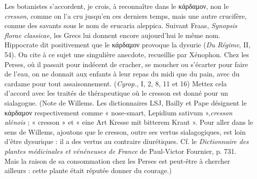 \documentclass[12pt]{book}%
\newcommand{\italique}[1]{\textit{#1}}%
\newcommand{\citComm}[1]{\begin{quoting}[vskip=0pt] #1 \end{quoting}}%
\newcommand{\latin}[1]{{\policeLat #1}}%
\newcommand{\allemand}[1]{{\policeAll #1}}%
\newcommand{\grec}[1]{#1}%
\newcommand{\anglais}[1]{{\policeAn #1}}%
\newcommand{\eff}[1]{%
{\color{orange}#1}%
}%
\newenvironment{groupe}{%
\pstart%
\ledgroup%
}{%
\pend %
}%
\newcommand{\LSJ}[0]{LSJ}%
\begin{document}
\begin{pages}
\begin{Leftside}
\begin{groupe}
{{%
%
Les botanistes s'accordent, je crois, à reconnaître dans le κάρδαμον, non le \italique{cresson}, comme on l'a cru jusqu'en ces derniers temps, mais une autre crucifère, connue des savants sous le nom de \latin{erucaria aleppica}. Suivant Fraas, \italique{Synopsis florae classicae}, les Grecs lui donnent encore aujourd'hui le même nom. Hippocrate dit positivement que le \grec{κάρδαμον} provoque la dysurie (\italique{Du Régime}, II, 54). On cite à ce sujet une singulière anecdote, recueillie par Xénophon. Chez les Perses, où il passait pour indécent de cracher, se moucher ou s'écarter pour faire de l'eau, on ne donnait aux enfants à leur repas du midi que du pain, avec du cardame pour tout assaisonnement. (\italique{Cyrop.}, I, 2, 8, 11 et 16) Mettez cela d'accord avec les traités de thérapeutique où le cresson est donné pour un sialagogue. (Note de Willems. Les dictionnaires  \LSJ , Bailly et Pape désignent le \grec{κάρδαμον} respectivement comme « \anglais{nose-smart}, \latin{Lepidium sativum} »,\italique{cresson alénois} ; « cresson » et « \allemand{eine Art Kresse mit bitterem Kraut} ».%
Pour aller dans le sens de Willems, ajoutons que le cresson, outre ses vertus sialagogiques, est loin d'être dysurique : il a des vertus au contraire diurétiques. Cf. le \italique{Dictionnaire des plantes médicinales et vénéneuses de France} de Paul-Victor Fournier, p. 731. Mais la raison de sa consommation chez les Perses est peut-être à chercher ailleurs : cette plante était réputée donner du courage.)}%
}
\end{groupe}
\end{Leftside}
\end{pages}
\end{document}
